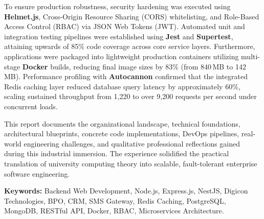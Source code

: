 To ensure production robustness, security hardening was executed using \textbf{Helmet.js}, Cross-Origin Resource Sharing (CORS) whitelisting, and Role-Based Access Control (RBAC) via JSON Web Tokens (JWT). Automated unit and integration testing pipelines were established using \textbf{Jest} and \textbf{Supertest}, attaining upwards of 85\% code coverage across core service layers. Furthermore, applications were packaged into lightweight production containers utilizing multi-stage \textbf{Docker} builds, reducing final image sizes by 83\% (from 840\,MB to 142\,MB). Performance profiling with \textbf{Autocannon} confirmed that the integrated Redis caching layer reduced database query latency by approximately 60\%, scaling sustained throughput from 1,220 to over 9,200 requests per second under concurrent loads.

This report documents the organizational landscape, technical foundations, architectural blueprints, concrete code implementations, DevOps pipelines, real-world engineering challenges, and qualitative professional reflections gained during this industrial immersion. The experience solidified the practical translation of university computing theory into scalable, fault-tolerant enterprise software engineering.

\vspace{0.8cm}
\noindent
\textbf{Keywords:} Backend Web Development, Node.js, Express.js, NestJS, Digicon Technologies, BPO, CRM, SMS Gateway, Redis Caching, PostgreSQL, MongoDB, RESTful API, Docker, RBAC, Microservices Architecture.

